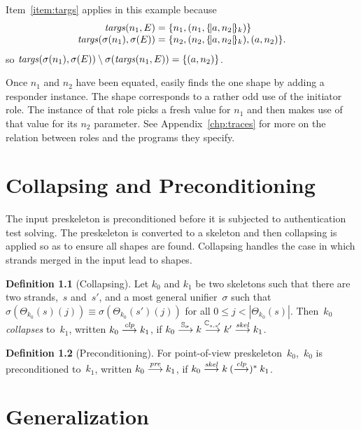 \documentclass[12pt]{report}
\theoremstyle{definition}
\newtheorem{defn}{Definition}[chapter]
\begin{document}
Item~\ref{item:targs} applies in this example because
\[\begin{array}{r@{{}={}}l}
\fn{targs}(n_1,E) & \{n_1,(n_1,\enc{a,n_2}{k})\}\\
\fn{targs}(\sigma(n_1),\sigma(E))&\{n_2,(n_2,\enc{a,n_2}{k}),(a,n_2)\}.
\end{array}\]
so
$\operatorname{\mathit{targs}}(\sigma(n_1),\sigma(E))\setminus\sigma(\operatorname{\mathit{targs}}(n_1,E))=\{(a,
n_2)\}$.

Once $n_1$ and $n_2$ have been equated, {\cpsa} easily finds the one
shape by adding a responder instance.  The shape corresponds to a
rather odd use of the initiator role.  The instance of that role picks
a fresh value for $n_1$ and then makes use of that value for its $n_2$
parameter.  See Appendix~\ref{chp:traces} for more on the relation
between roles and the programs they specify.

\chapter{Collapsing and Preconditioning}\label{chp:collapsing}

The input preskeleton is preconditioned before it is subjected to
authentication test solving.  The preskeleton is converted to a
skeleton and then collapsing is applied so as to ensure all shapes are
found.  Collapsing handles the case in which strands merged in the
input lead to shapes.

\begin{defn}[Collapsing]
Let $k_0$ and $k_1$ be two skeletons such that there are two
strands,~$s$ and~$s'$, and a most general unifier~$\sigma$ such that
$\sigma(\Theta_{k_0}(s)(j))\equiv \sigma(\Theta_{k_0}(s')(j))$ for all
$0\leq j<|\Theta_{k_0}(s)|$.  Then~$k_0$ \emph{collapses} to~$k_1$,
written $k_0\stackrel{\operatorname{\mathit{clp}}}{\longrightarrow}k_1$, if
$k_0\stackrel{\mathbb S_\sigma}{\longrightarrow}k\stackrel{\mathbb C_{s,s'}}{\longrightarrow}k'
\stackrel{\operatorname{\mathit{skel}}}{\longrightarrow}k_1$.
\end{defn}

\begin{defn}[Preconditioning]
For point-of-view preskeleton~$k_0$,~$k_0$ is preconditioned to~$k_1$,
written $k_0\stackrel{\operatorname{\mathit{pre}}}{\longrightarrow}k_1$, if
$k_0\stackrel{\operatorname{\mathit{skel}}}{\longrightarrow}k\mathbin{(\stackrel{\operatorname{\mathit{clp}}}{\longrightarrow})^\ast}k_1$.
\end{defn}

\chapter{Generalization}\label{chp:generalization}
\end{document}

